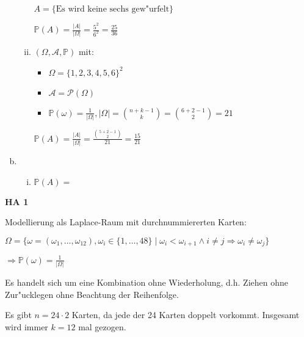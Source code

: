 \documentclass[a4paper,12pt]{article}
\newcommand{\Aufgabe}[1]{
        {
        \vspace*{0.5cm}
        \textbf{HA #1}
        \vspace*{0.2cm}
    }
}
\begin{document}
\begin{enumerate}[(a)]
\begin{enumerate}[i.]
        \smallskip

        $ A = \{\text{Es wird keine sechs gew"urfelt}\} $

        $ \displaystyle \mathbb{P}(A) = \frac{|A|}{|\Omega|} = \frac{5^2}{6^2} = \frac{25}{36} $
    
        \newpage 

        \item

        $ (\Omega, \mathcal{A}, \mathbb{P}) $ mit:
        \begin{itemize}
            \item $ \Omega = \{1, 2, 3, 4, 5, 6\}^2 $
            \item $ \mathcal{A} = \mathcal{P}(\Omega) $
            \item $ \mathbb{P}(\omega) = \frac{1}{|\Omega|}, |\Omega| = \binom{n + k - 1}{k} = \binom{6 + 2 - 1}{2} = 21 $
        \end{itemize}

        \smallskip

        $ \displaystyle \mathbb{P}(A) = \frac{|A|}{|\Omega|} = \frac{\binom{5 + 2 - 1}{2}}{21} = \frac{15}{21} $
        
        \end{enumerate}
    
        \item

        \begin{enumerate}[i.]
            \item 

            $ \mathbb{P}(A) =  $
        \end{enumerate}

    \end{enumerate}

    \Aufgabe{1} 

    Modellierung als Laplace-Raum mit durchnummiererten Karten:

    $ \Omega = \{\omega = (\omega_1, \dots, \omega_{12}), \omega_i \in \{1, \dots, 48\} \mid \omega_i < \omega_{i + 1} \land i \neq j \Rightarrow \omega_i \neq \omega_j\} $

    $ \displaystyle \Rightarrow \mathbb{P}(\omega) = \frac{1}{|\Omega|} $

    Es handelt sich um eine Kombination ohne Wiederholung, d.h. Ziehen ohne Zur"ucklegen ohne Beachtung der Reihenfolge.

    \bigskip

    Es gibt $ n = 24 \cdot 2 $ Karten, da jede der 24 Karten doppelt vorkommt. Insgesamt wird immer $ k = 12 $ mal gezogen.
\end{document}
